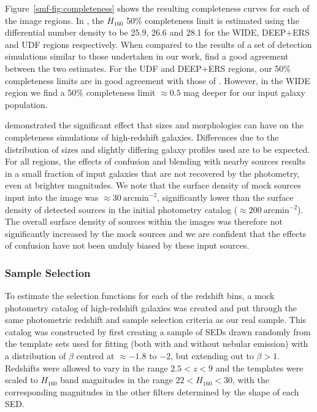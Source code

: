 Figure~\ref{smf-fig:completeness} shows the resulting completeness curves for each of the image regions. In \citet{Guo:2013ig}, the $H_{160}$ 50\% completeness limit is estimated using the differential number density to be 25.9, 26.6 and 28.1 for the WIDE, DEEP+ERS and UDF regions respectively. When compared to the results of a set of detection simulations similar to those undertaken in our work, \citet{Guo:2013ig} find a good agreement between the two estimates. For the UDF and DEEP+ERS regions, our 50\% completeness limits are in good agreement with those of \citet{Guo:2013ig}. However, in the WIDE region we find a 50\% completeness limit $\approx 0.5$ mag deeper for our input galaxy population.

\citet{2011A&A...532A..33G} demonstrated the significant effect that sizes and morphologies can have on the completeness simulations of high-redshift galaxies. Differences due to the distribution of sizes and slightly differing galaxy profiles used are to be expected. For all regions, the effects of confusion and blending with nearby sources results in a small fraction of input galaxies that are not recovered by the photometry, even at brighter magnitudes. We note that the surface density of mock sources input into the image was $\approx 30 ~ \text{arcmin}^{-2}$, significantly lower than the surface density of detected sources in the initial photometry catalog ($\approx 200 ~ \text{arcmin}^{-2}$). The overall surface density of sources within the images was therefore not significantly increased by the mock sources and we are confident that the effects of confusion have not been unduly biased by these input sources.

\subsubsection{Sample Selection}\label{smf-sec:selection_sims}
To estimate the selection functions for each of the redshift bins, a mock photometry catalog of high-redshift galaxies was created and put through the same photometric redshift and sample selection criteria as our real sample. This catalog was constructed by first creating a sample of SEDs drawn randomly from the template sets used for fitting (both with and without nebular emission) with a distribution of $\beta$ centred at $\approx -1.8$ to $-2$, but extending out to $\beta > 1$. Redshifts were allowed to vary in the range $2.5 < z < 9$ and the templates were scaled to $H_{160}$ band magnitudes in the range $22 < H_{160} < 30$, with the corresponding magnitudes in the other filters determined by the shape of each SED.

